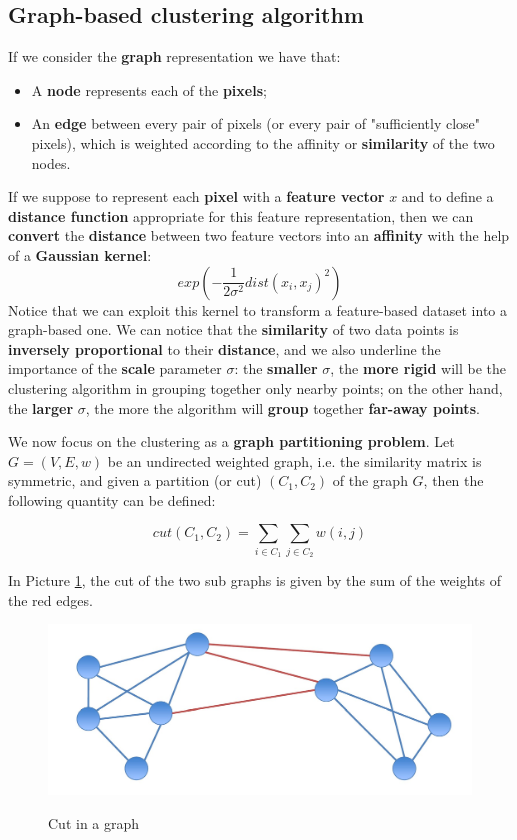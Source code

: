 \subsection{Graph-based clustering algorithm}
If we consider the \textbf{graph} representation we have that:
\begin{itemize}
	\item A \textbf{node} represents each of the \textbf{pixels};
	\item An \textbf{edge} between every pair of pixels (or every pair of "sufficiently close" pixels), which is weighted according to the affinity or \textbf{similarity} of the two nodes.
\end{itemize}  
If we suppose to represent each \textbf{pixel} with a \textbf{feature vector} $x$ and to define a \textbf{distance function} appropriate for this feature representation, then we can \textbf{convert} the \textbf{distance} between two feature vectors into an \textbf{affinity} with the help of a \textbf{Gaussian kernel}:
$$exp\left(-\frac{1}{2\sigma^2} dist(x_i, x_j)^2\right)$$
Notice that we can exploit this kernel to transform a feature-based dataset into a graph-based one. We can notice that the \textbf{similarity} of two data points is \textbf{inversely proportional} to their \textbf{distance}, and we also underline the importance of the \textbf{scale} parameter $\sigma$: the \textbf{smaller} $\sigma$, the \textbf{more rigid} will be the clustering algorithm in grouping together only nearby points; on the other hand, the \textbf{larger} $\sigma$, the more the algorithm will \textbf{group} together \textbf{far-away points}.

We now focus on the clustering as a \textbf{graph partitioning problem}. Let $G=(V,E,w)$ be an undirected weighted graph, i.e. the similarity matrix is symmetric, and given a partition (or cut) $(C_1, C_2)$ of the graph $G$, then the following quantity can be defined:

$$
cut(C_1,C_2) = \sum_{i \in C_1} \sum_{j \in C_2} w(i,j)
$$

In Picture \ref{cut}, the cut of the two sub graphs is given by the sum of the weights of the red edges.

\begin{figure}[h!]
		\centering
		\includegraphics[scale = 0.6]{img/cut.jpg}
		\label{cut}
		\caption{Cut in a graph}
\end{figure}


